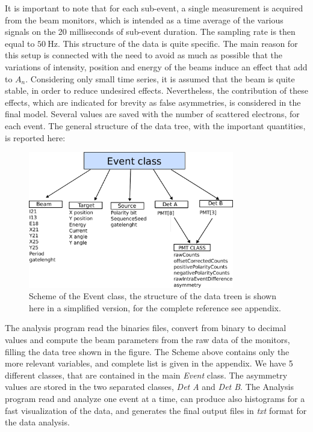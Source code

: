  It is important to note that for each sub-event, a single measurement is acquired from the beam monitors, which is intended as a time average of the various signals on the 20 milliseconds of sub-event duration. The sampling rate is then equal to $\SI{50}{\hertz}$.
This structure of the data is quite specific. The main reason for this setup is connected with the need to avoid as much as possible that the variations of intensity, position and energy of the beams induce an effect that add to $A_{n}$. Considering only small time series, it is assumed that the beam is quite stable, in order to reduce undesired effects.
Nevertheless, the contribution of these effects, which are indicated for brevity as false asymmetries, is considered in the final model.
Several values are saved with the number of scattered electrons, for each event. The general structure of the data tree, with the important quantities, is reported here:

\begin{figure}[hbtp]
\centering
\includegraphics[width = 0.8\textwidth]{Analysis/EventClass.pdf}
\caption{Scheme of the Event class, the structure of the data treen is shown here in a simplified version, for the complete reference see appendix.}
\end{figure}

The analysis program read the binaries files, convert from binary to decimal values and compute the beam parameters from the raw data of the monitors,   filling the data tree shown in the figure. The Scheme above contains only the more relevant variables, and complete list is given in the appendix. We have 5 different classes, that are contained in the main \textit{Event} class. The asymmetry values are stored in the two separated classes, \textit{Det A} and \textit{Det B}. The Analysis program read and analyze one event at a time, can produce also histograms for a fast visualization of the data, and generates the final output files in \textit{txt} format for the data analysis.  

